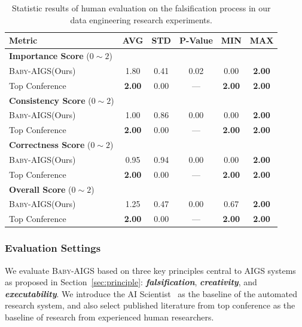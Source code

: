 \documentclass{article} %
\newcommand{\AIGS}{AIGS\xspace}
\newcommand{\AIGSSys}{\textsc{Baby-AIGS}\xspace}
\begin{document}
\begin{table}[t]
\centering
\begin{tabular}{lccccc}
\toprule
             \textbf{Metric}              & \textbf{AVG}  & \textbf{STD}  & \textbf{P-Value} & \textbf{MIN} & \textbf{MAX} \\ \midrule\midrule 
\textbf{Importance Score} ($0\sim2$)  &      &      &         &     &     \\
\AIGSSys (Ours)        & 1.80 & 0.41 & 0.02    & 0.00   & \textbf{2.00}   \\
Top Conference             & \textbf{2.00} & 0.00 & ---     & \textbf{2.00}   & \textbf{2.00}   \\ \midrule 
\textbf{Consistency Score} ($0\sim2$) &      &      &         &     &     \\
\AIGSSys (Ours)        & 1.00 & 0.86 & 0.00    & 0.00   & \textbf{2.00}   \\
Top Conference             & \textbf{2.00} & 0.00 & ---     & \textbf{2.00}   & \textbf{2.00}   \\ \midrule 
\textbf{Correctness Score} ($0\sim2$) &      &      &         &     &     \\
\AIGSSys (Ours)        & 0.95 & 0.94 & 0.00    & 0.00   & \textbf{2.00}   \\
Top Conference             & \textbf{2.00} & 0.00 & ---     & \textbf{2.00}   & \textbf{2.00}   \\ \midrule 
\textbf{Overall Score} ($0\sim2$)     &      &      &         &     &     \\
\AIGSSys (Ours)        & 1.25 & 0.47 & 0.00    & 0.67   & \textbf{2.00}   \\
Top Conference             & \textbf{2.00} & 0.00 & ---     & \textbf{2.00}   & \textbf{2.00}   \\ \bottomrule
\end{tabular}
\caption{Statistic results of human evaluation on the falsification process in our data engineering research experiments.}
\label{tab:human}
\end{table}

\subsubsection{Evaluation Settings}

We evaluate \AIGSSys based on three key principles central to \AIGS systems as proposed in Section~\ref{sec:principle}: \textbf{\textit{falsification}}, \textbf{\textit{creativity}}, and \textbf{\textit{executability}}. We introduce the AI Scientist~\citep{lu2024aiscientist} as the baseline of the automated research system, and also select published literature from top conference as the baseline of research from experienced human researchers. 
\end{document}
